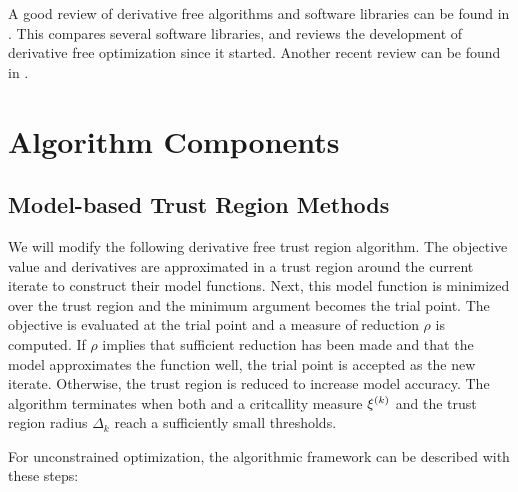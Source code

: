 A good review of derivative free algorithms and software libraries can be found in \cite{DUMMY:review}.
This compares several software libraries, and reviews the development of derivative free optimization since it started.
Another recent review can be found in \cite{DUMMY:review2}.



\section{Algorithm Components}


\subsection{Model-based Trust Region Methods}

We will modify the following derivative free trust region algorithm.
The objective value and derivatives are approximated in a trust region around the current iterate to construct their model functions.
Next, this model function is minimized over the trust region and the minimum argument becomes the trial point.
The objective is evaluated at the trial point and a measure of reduction $\rho$ is computed.
If $\rho$ implies that sufficient reduction has been made and that the model approximates the function well, the trial point is accepted as the new iterate.
Otherwise, the trust region is reduced to increase model accuracy.
The algorithm terminates when both and a critcallity measure ${\xi^{(k)}}$ and the trust region radius $\Delta_k$ reach a sufficiently small thresholds.


For unconstrained optimization, the algorithmic framework can be described with these steps:

